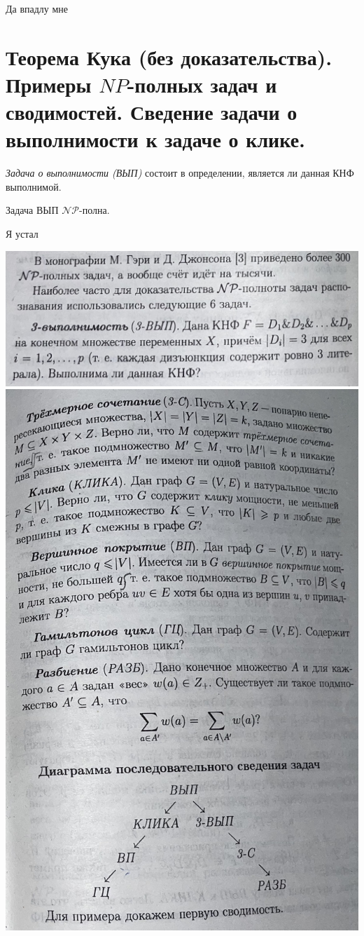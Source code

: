\begin{note}
    Да впадлу мне
\end{note}

\section{Теорема Кука (без доказательства). Примеры $NP$-полных задач и сводимостей. Сведение задачи о выполнимости к задаче о клике.}

\begin{note}
    \emph{Задача о выполнимости (ВЫП)} состоит в определении, является ли данная КНФ выполнимой.
\end{note}

\begin{theorem}[Кука]
    Задача ВЫП $ \mathcal{NP} $-полна.
\end{theorem}

\begin{note}
    Я устал
    
    \includegraphics[scale=0.1]{figures/need2.png}
    \includegraphics[scale=0.1]{figures/need1.png}
\end{note}
